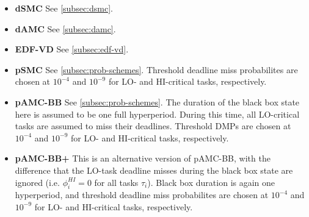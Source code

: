 \documentclass[a4paper,oneside]{csthesis}
\begin{document}
\begin{itemize}
    \item \textbf{dSMC} \newline See \cref{subsec:dsmc}.
    \item \textbf{dAMC} \newline See \cref{subsec:damc}.
    \item \textbf{EDF-VD} \newline See \cref{subsec:edf-vd}.
    \item \textbf{pSMC} \newline See \cref{subsec:prob-schemes}. Threshold deadline miss probabilites are chosen at $10^{-4}$ and $10^{-9}$ for LO- and HI-critical tasks, respectively.
    \item \textbf{pAMC-BB} \newline See \cref{subsec:prob-schemes}. The duration of the black box state here is assumed to be one full hyperperiod. During this time, all LO-critical tasks are assumed to miss their deadlines. Threshold DMPs are chosen at $10^{-4}$ and $10^{-9}$ for LO- and HI-critical tasks, respectively.
    \item \textbf{pAMC-BB+} \newline This is an alternative version of pAMC-BB, with the difference that the LO-task deadline misses during the black box state are ignored (i.e. $\phi_i^{HI} = 0$ for all tasks $\tau_i$). Black box duration is again one hyperperiod, and threshold deadline miss probabilites are chosen at $10^{-4}$ and $10^{-9}$ for LO- and HI-critical tasks, respectively.
\end{itemize}
\end{document}
